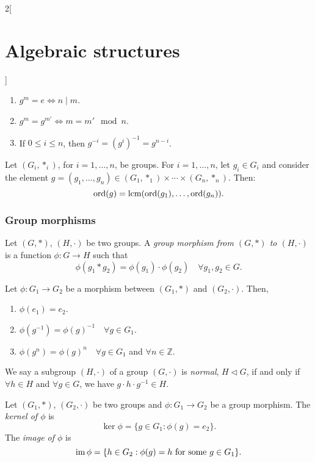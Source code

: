 \documentclass[../../../main.tex]{subfiles}
\begin{document}
\begin{multicols}{2}[\section{Algebraic structures}]
\begin{lemma}
    \begin{enumerate}
        \item $g^m=e\iff n\mid m$.
        \item $g^m=g^{m'}\iff m=m'\mod{n}$.
        \item If $0\leq i\leq n$, then $g^{-i}=(g^i)^{-1}=g^{n-i}$.
    \end{enumerate}
\end{lemma}
\begin{corollary}
    Let $(G_i,*_i)$, for $i=1,\ldots, n$, be groups. For $i=1,\ldots,n$, let $g_i\in G_i$ and consider the element $g=(g_1,\ldots,g_n)\in(G_1,*_1)\times\cdots\times(G_n,*_n)$. Then: $$\text{ord}(g)=\operatorname{lcm}(\text{ord}(g_1),\ldots,\text{ord}(g_n)).$$
\end{corollary}
\subsubsection*{Group morphisms}
\begin{definition}\label{AS-groupmorphism}
    Let $(G,*)$, $(H,\cdot)$ be two groups. A \textit{group morphism from $(G,*)$ to $(H,\cdot)$} is a function $\phi:G\rightarrow H$ such that $$\phi(g_1*g_2)=\phi(g_1)\cdot\phi(g_2)\quad\forall g_1,g_2\in G.$$
\end{definition}
\begin{lemma}
    Let $\phi:G_1\rightarrow G_2$ be a morphism between $(G_1,*)$ and $(G_2,\cdot)$. Then,
    \begin{enumerate}
        \item $\phi(e_1)=e_2$.
        \item $\phi(g^{-1})=\phi(g)^{-1}\quad\forall g\in G_1$.
        \item $\phi(g^n)=\phi(g)^n\quad\forall g\in G_1$ and $\forall n\in\mathbb{Z}$.
    \end{enumerate}
\end{lemma}
\begin{definition}
    We say a subgroup $(H,\cdot)$ of a group $(G,\cdot)$ is \textit{normal}, $H\lhd G$, if and only if $\forall h\in H$ and $\forall g\in G$, we have $g\cdot h\cdot g^{-1}\in H$.
\end{definition}
\begin{definition}
    Let $(G_1,*)$, $(G_2,\cdot)$ be two groups and $\phi:G_1\rightarrow G_2$ be a group morphism. The \textit{kernel of $\phi$} is $$\ker\phi=\{g\in G_1:\phi(g)=e_2\}.$$ The \textit{image of $\phi$} is $$\operatorname{im}\phi=\{h\in G_2:\phi(g)=h\text{ for some }g\in G_1\}.$$

\end{definition}
\end{multicols}
\end{document}
